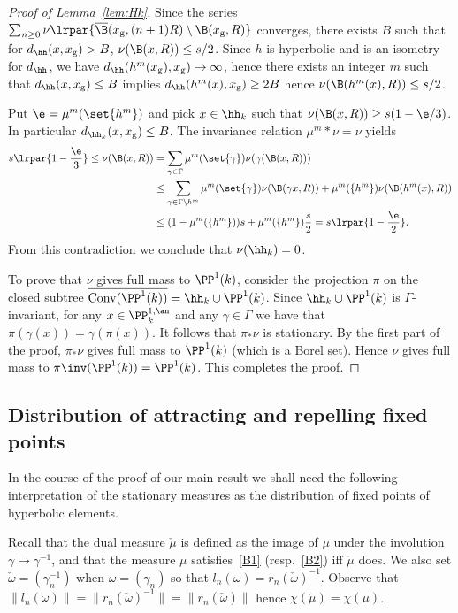 \begin{step}[Step 4]
\begin{proof}[Proof of Lemma~\ref{lem:Hk}]
Since the series $\sum_{n\geq 0} \nu \lrpar{\overline{\B}(x_{\mathrm{g}}, (n+1)R)\setminus \B(x_{\mathrm{g}}, R)}$ converges, there exists $B$ such that for $d_\hh(x,x_{\mathrm{g}})> B$, $\nu(\B(x,R))\leq s/2$. Since $h$ is hyperbolic and is an isometry for $d_\hh$, we have $d_\hh(h^m(x_{\mathrm{g}}), x_{\mathrm{g}}) \to \infty$, hence there exists an integer $m$ such that $d_\hh(x,x_{\mathrm{g}}) \le B$ implies $d_\hh(h^m(x), x_{\mathrm{g}})\ge 2B$ hence $\nu (\B(h^m(x),R)) \le s/2$.

Put $\e = \mu^m(\set{h^m})$ and pick $x\in \hh_k$ such that $\nu(\B(x,R))\geq s(1-\e/3)$. In particular $d_{\hh_k}(x,x_{\mathrm{g}})\le B$. The invariance relation $\mu^m\ast \nu = \nu$ yields
\begin{align*}
s\lrpar{1-\frac{\e}{3}} \leq \nu(\B(x,R)) &= \sum_{\gamma \in \Gamma} \mu^m(\set{\gamma}) \nu(\gamma (\B(x,R))) \\
&\leq \sum_{\gamma \in \Gamma\setminus{h^m} } \mu^m(\set{\gamma}) \nu(\B(\gamma x,R)) +
\mu^m(\{h^m\}) \nu(\B(h^m(x), R))\\
&\leq (1- \mu^m(\{h^m\})) s + \mu^m(\{h^m\}) \frac{s}{2} = s \lrpar{1-\frac{\e}{2}}.
\end{align*}
From this contradiction we conclude that $\nu(\hh_k)=0$.

To prove that $\nu$ gives full mass to $\PP^1(k)$, consider the projection $\pi$ on the closed subtree $\overline{\mathrm{Conv}(\PP^1(k))} = \hh_k \cup \PP^1(k)$. Since $\hh_k \cup \PP^1(k)$ is $\Gamma$-invariant, for any $x\in \PP^{1, \an}_k$ and any $\gamma\in \Gamma$ we have that $\pi(\gamma(x)) = \gamma(\pi(x))$. It follows that $\pi_*\nu$ is stationary. By the first part of the proof, $\pi_*\nu$ gives full mass to $\PP^1(k)$ (which is a Borel set). Hence $\nu$ gives full mass to $\pi\inv(\PP^1(k)) = \PP^1(k)$. This completes the proof.
\end{proof}
\end{step}

\subsection{Distribution of attracting and repelling fixed points}

In the course of the proof of our main result we shall need the following interpretation of the stationary measures as the distribution of fixed points of hyperbolic elements.

Recall that the dual measure $\check{\mu}$ is defined as the image of $\mu$ under the involution $\gamma\mapsto \gamma^{-1}$, and that the measure $\mu$ satisfies~\eqref{B1} (resp.~\eqref{B2}) iff $\check{\mu}$ does. We also set $\check{\omega} = (\gamma_n^{-1})$ when $\omega = (\gamma_n)$ so that $l_n(\omega) = r_n(\check{\omega})^{-1}$. Observe that $\|l_n(\omega)\| = \|r_n(\check{\omega})^{-1}\| = \|r_n(\check{\omega})\|$ hence $\chi(\check{\mu}) = \chi(\mu)$.

